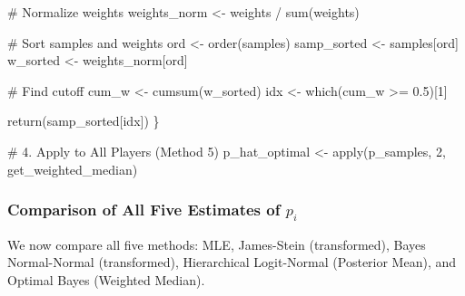 \documentclass[
  letterpaper,
  DIV=11,
  numbers=noendperiod]{scrreprt}
\newenvironment{Shaded}{\begin{snugshade}}{\end{snugshade}}
\newcommand{\CommentTok}[1]{\textcolor[rgb]{0.37,0.37,0.37}{#1}}
\newcommand{\DecValTok}[1]{\textcolor[rgb]{0.68,0.00,0.00}{#1}}
\newcommand{\FloatTok}[1]{\textcolor[rgb]{0.68,0.00,0.00}{#1}}
\newcommand{\FunctionTok}[1]{\textcolor[rgb]{0.28,0.35,0.67}{#1}}
\newcommand{\NormalTok}[1]{\textcolor[rgb]{0.00,0.23,0.31}{#1}}
\newcommand{\OtherTok}[1]{\textcolor[rgb]{0.00,0.23,0.31}{#1}}
\newcommand{\SpecialCharTok}[1]{\textcolor[rgb]{0.37,0.37,0.37}{#1}}
\renewcommand{\[}{\begin{equation}}
\renewcommand{\]}{\end{equation}}
\theoremstyle{definition}
\theoremstyle{plain}
\theoremstyle{plain}
\theoremstyle{plain}
\theoremstyle{definition}
\theoremstyle{plain}
\theoremstyle{remark}
\begin{document}
\begin{Shaded}
\begin{Highlighting}[]
  \CommentTok{\# Normalize weights}
\NormalTok{  weights\_norm }\OtherTok{\textless{}{-}}\NormalTok{ weights }\SpecialCharTok{/} \FunctionTok{sum}\NormalTok{(weights)}
  
  \CommentTok{\# Sort samples and weights}
\NormalTok{  ord }\OtherTok{\textless{}{-}} \FunctionTok{order}\NormalTok{(samples)}
\NormalTok{  samp\_sorted }\OtherTok{\textless{}{-}}\NormalTok{ samples[ord]}
\NormalTok{  w\_sorted }\OtherTok{\textless{}{-}}\NormalTok{ weights\_norm[ord]}
  
  \CommentTok{\# Find cutoff}
\NormalTok{  cum\_w }\OtherTok{\textless{}{-}} \FunctionTok{cumsum}\NormalTok{(w\_sorted)}
\NormalTok{  idx }\OtherTok{\textless{}{-}} \FunctionTok{which}\NormalTok{(cum\_w }\SpecialCharTok{\textgreater{}=} \FloatTok{0.5}\NormalTok{)[}\DecValTok{1}\NormalTok{]}
  
  \FunctionTok{return}\NormalTok{(samp\_sorted[idx])}
\NormalTok{\}}

\CommentTok{\# 4. Apply to All Players (Method 5)}
\NormalTok{p\_hat\_optimal }\OtherTok{\textless{}{-}} \FunctionTok{apply}\NormalTok{(p\_samples, }\DecValTok{2}\NormalTok{, get\_weighted\_median)}
\end{Highlighting}
\end{Shaded}

\subsubsection{\texorpdfstring{Comparison of All Five Estimates of
\(p_i\)}{Comparison of All Five Estimates of p\_i}}\label{comparison-of-all-five-estimates-of-p_i}

We now compare all five methods: MLE, James-Stein (transformed), Bayes
Normal-Normal (transformed), Hierarchical Logit-Normal (Posterior Mean),
and Optimal Bayes (Weighted Median).
\end{document}
